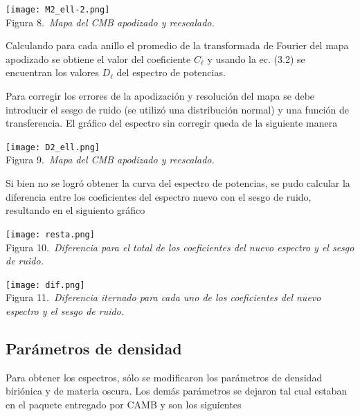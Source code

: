\documentclass[twocolumn,letterpaper,spanish]{revtex4}
\numberwithin{equation}{section}
\begin{document}
\begin{center}
  \texttt{[image: M2\_ell-2.png]}\\
   Figura 8.\emph{\ Mapa del CMB apodizado y reescalado.}
\end{center}


Calculando para cada anillo el promedio de la transformada de Fourier del mapa apodizado se obtiene el valor del coeficiente $C_{\ell}$ y usando la ec. (3.2) se encuentran los valores $D_{\ell}$ del espectro de potencias.


Para corregir los errores de la apodizaci\'on y resoluci\'on del mapa se debe introducir el sesgo de ruido (se utiliz\'o una distribuci\'on normal) y una funci\'on de transferencia. El gr\'afico del espectro sin corregir queda de la siguiente manera 

\begin{center}
  \texttt{[image: D2\_ell.png]}\\
   Figura 9.\emph{\ Mapa del CMB apodizado y reescalado.}
\end{center}

Si bien no se logr\'o obtener la curva del espectro de potencias, se pudo calcular la diferencia entre los coeficientes del espectro nuevo con el sesgo de ruido, resultando en el siguiento gr\'afico

\begin{center}
   \texttt{[image: resta.png]}\\
   Figura 10.\emph{\ Diferencia para el total de los coeficientes del nuevo espectro y el sesgo de ruido.}
\end{center}


\begin{center}
   \texttt{[image: dif.png]}\\
   Figura 11.\emph{\ Diferencia iternado para cada uno de los coeficientes del nuevo espectro y el sesgo de ruido.}
\end{center}


\subsection{Par\'ametros de densidad}

Para obtener los espectros, s\'olo se modificaron los par\'ametros de densidad biri\'onica y de materia oscura. Los dem\'as par\'ametros se dejaron tal cual estaban en el paquete entregado por CAMB y son los siguientes 
\end{document}
